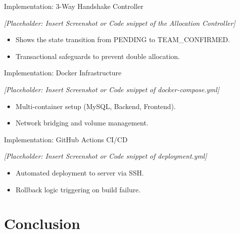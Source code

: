 \documentclass[aspectratio=169]{beamer}
\begin{document}
\begin{frame}[fragile]{Implementation: 3-Way Handshake Controller}
    \begin{center}
        \textit{[Placeholder: Insert Screenshot or Code snippet of the Allocation Controller]}
    \end{center}
    \vspace{1cm}
    \begin{itemize}
        \item Shows the state transition from PENDING to TEAM\_CONFIRMED.
        \item Transactional safeguards to prevent double allocation.
    \end{itemize}
\end{frame}

\begin{frame}[fragile]{Implementation: Docker Infrastructure}
    \begin{center}
        \textit{[Placeholder: Insert Screenshot or Code snippet of docker-compose.yml]}
    \end{center}
    \vspace{1cm}
    \begin{itemize}
        \item Multi-container setup (MySQL, Backend, Frontend).
        \item Network bridging and volume management.
    \end{itemize}
\end{frame}

\begin{frame}[fragile]{Implementation: GitHub Actions CI/CD}
    \begin{center}
        \textit{[Placeholder: Insert Screenshot or Code snippet of deployment.yml]}
    \end{center}
    \vspace{1cm}
    \begin{itemize}
        \item Automated deployment to server via SSH.
        \item Rollback logic triggering on build failure.
    \end{itemize}
\end{frame}

\section{Conclusion}
\end{document}

